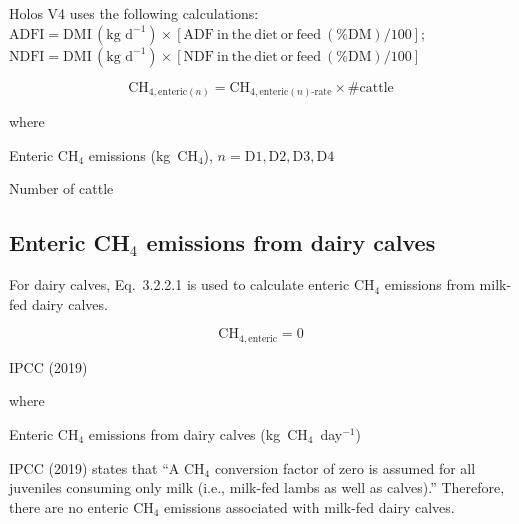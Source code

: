 \noindent Holos V4 uses the following calculations:
$\mathrm{ADFI} = \mathrm{DMI}\,(\text{kg~d}^{-1}) \times [\mathrm{ADF\ in\ the\ diet\ or\ feed}\ (\%\mathrm{DM})/100]$;
$\mathrm{NDFI} = \mathrm{DMI}\,(\text{kg~d}^{-1}) \times [\mathrm{NDF\ in\ the\ diet\ or\ feed}\ (\%\mathrm{DM})/100]$

\begin{equation}
    \mathrm{CH}_{4,\mathrm{enteric}(n)} =
        \mathrm{CH}_{4,\mathrm{enteric}(n)\mathrm{\text{-}rate}} \times \#\mathrm{cattle}
    \tag{Eq.\ 3.2.1.17}
\end{equation}

\noindent where
\begin{description}[font=\normalfont, leftmargin=9em, style=sameline, nosep]
    \item[$\mathrm{CH}_{4,\mathrm{enteric}(n)}$] Enteric CH$_4$ emissions
          (kg~CH$_4$), $n = \mathrm{D1, D2, D3, D4}$
    \item[$\#\mathrm{cattle}$] Number of cattle
\end{description}

\subsection{Enteric CH\texorpdfstring{$_4$}{4} emissions from dairy calves}
\label{subsec:dairy-calves}

For dairy calves, Eq.~3.2.2.1 is used to calculate enteric CH$_4$ emissions from
milk-fed dairy calves.

\begin{equation}
    \mathrm{CH}_{4,\mathrm{enteric}} = 0
    \tag{Eq.\ 3.2.2.1}
\end{equation}

\noindent IPCC (2019)

\noindent where
\begin{description}[font=\normalfont, leftmargin=9em, style=sameline, nosep]
    \item[$\mathrm{CH}_{4,\mathrm{enteric}}$] Enteric CH$_4$ emissions from dairy
          calves (kg~CH$_4$~day$^{-1}$)
\end{description}

\noindent IPCC (2019) states that ``A CH$_4$ conversion factor of zero is assumed for
all juveniles consuming only milk (i.e., milk-fed lambs as well as calves).'' Therefore,
there are no enteric CH$_4$ emissions associated with milk-fed dairy calves.

